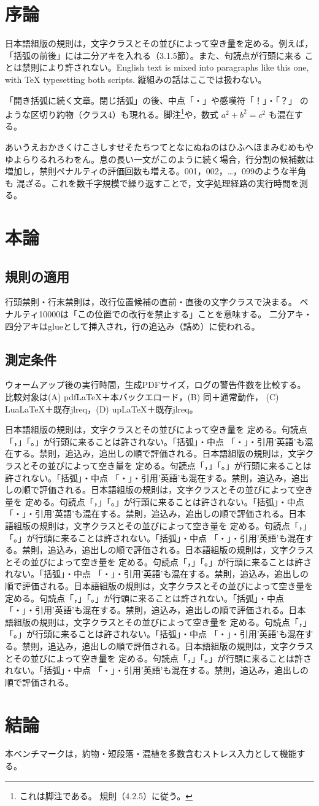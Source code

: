 \documentclass[pdflatex]{jlreq}
\begin{document}
\section{序論}
日本語組版の規則は，文字クラスとその並びによって空き量を定める。例えば，
「括弧の前後」には二分アキを入れる（3.1.5節）。また、句読点が行頭に来る
ことは禁則により許されない。English text is mixed into paragraphs like this
one, with TeX typesetting both scripts. 縦組みの話はここでは扱わない。

「開き括弧に続く文章。閉じ括弧」の後、中点「・」や感嘆符「！」・「？」
のような区切り約物（クラス4）も現れる。脚注\footnote{これは脚注である。
規則（4.2.5）に従う。}や，数式 $a^2+b^2=c^2$ も混在する。

あいうえおかきくけこさしすせそたちつてとなにぬねのはひふへほまみむめもや
ゆよらりるれろわをん。息の長い一文がこのように続く場合，行分割の候補数は
増加し，禁則ペナルティの評価回数も増える。001，002，…，099のような半角も
混ざる。これを数千字規模で繰り返すことで，文字処理経路の実行時間を測る。

\section{本論}
\subsection{規則の適用}
行頭禁則・行末禁則は，改行位置候補の直前・直後の文字クラスで決まる。
ペナルティ10000は「この位置での改行を禁止する」ことを意味する。
二分アキ・四分アキはglueとして挿入され，行の追込み（詰め）に使われる。

\subsection{測定条件}
ウォームアップ後の実行時間，生成PDFサイズ，ログの警告件数を比較する。
比較対象は(A) pdfLaTeX＋本バックエロード，(B) 同＋通常動作，
(C) LuaLaTeX＋既存jlreq，(D) upLaTeX＋既存jlreq。

\def\para#1{#1 #1 #1 #1 #1}
\def\parablock{日本語組版の規則は，文字クラスとその並びによって空き量を
定める。句読点「，」「。」が行頭に来ることは許されない。「括弧」・中点
「・」・引用'英語'も混在する。禁則，追込み，追出しの順で評価される。}

\parablock\parablock\parablock\parablock\parablock\parablock\parablock\parablock

\section{結論}
本ベンチマークは，約物・短段落・混植を多数含むストレス入力として機能する。
\end{document}
